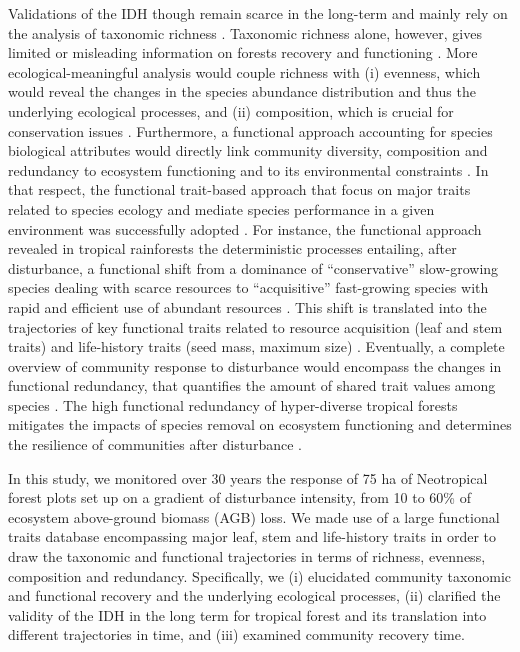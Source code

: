 \documentclass[fleqn,10pt]{ArtEcoFoG} %
\begin{document}
Validations of the IDH though remain scarce in the long-term and mainly
rely on the analysis of taxonomic richness \citep{Molino2001}. Taxonomic
richness alone, however, gives limited or misleading information on
forests recovery and functioning \citep{Chaudhary2016}. More
ecological-meaningful analysis would couple richness with (i) evenness,
which would reveal the changes in the species abundance distribution and
thus the underlying ecological processes, and (ii) composition, which is
crucial for conservation issues \citep{Lavorel2002, Bellwood2006}.
Furthermore, a functional approach accounting for species biological
attributes would directly link community diversity, composition and
redundancy to ecosystem functioning and to its environmental constraints
\citep{Violle2007b, Baraloto2012a}. In that respect, the functional
trait-based approach that focus on major traits related to species
ecology and mediate species performance in a given environment was
successfully adopted \citep{Diaz2005}. For instance, the functional
approach revealed in tropical rainforests the deterministic processes
entailing, after disturbance, a functional shift from a dominance of
``conservative'' slow-growing species dealing with scarce resources to
``acquisitive'' fast-growing species with rapid and efficient use of
abundant resources \citep{Reich2014, Herault2011}. This shift is
translated into the trajectories of key functional traits related to
resource acquisition (leaf and stem traits) and life-history traits
(seed mass, maximum size)
\citep{Wright2004, TerSteege2006, Westoby2006a, Chave2009b}. Eventually,
a complete overview of community response to disturbance would encompass
the changes in functional redundancy, that quantifies the amount of
shared trait values among species \citep{Carmona2016}. The high
functional redundancy of hyper-diverse tropical forests
\citep{Bellwood2006} mitigates the impacts of species removal on
ecosystem functioning and determines the resilience of communities after
disturbance \citep{Elmqvist2003, Diaz2005}.

In this study, we monitored over 30 years the response of 75 ha of
Neotropical forest plots set up on a gradient of disturbance intensity,
from 10 to 60\% of ecosystem above-ground biomass (AGB) loss. We made
use of a large functional traits database encompassing major leaf, stem
and life-history traits in order to draw the taxonomic and functional
trajectories in terms of richness, evenness, composition and redundancy.
Specifically, we (i) elucidated community taxonomic and functional
recovery and the underlying ecological processes, (ii) clarified the
validity of the IDH in the long term for tropical forest and its
translation into different trajectories in time, and (iii) examined
community recovery time.
\end{document}
